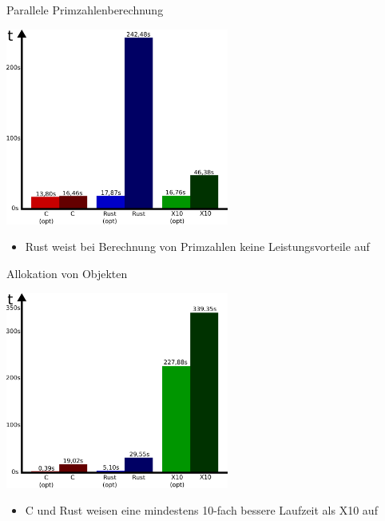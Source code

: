 \begin{frame}{Parallele Primzahlenberechnung}
  \begin{center}
    \includegraphics[width=0.55\textwidth]{images/primes-eval.pdf}
  \end{center}
  \begin{itemize}
    \item Rust weist bei Berechnung von Primzahlen keine Leistungsvorteile auf
  \end{itemize}
\end{frame}

\begin{frame}{Allokation von Objekten}
  \begin{center}
    \includegraphics[width=0.55\textwidth]{images/garbage-eval.pdf}
  \end{center}
  \begin{itemize}
    \item C und Rust weisen eine mindestens 10-fach bessere Laufzeit als X10 auf
  \end{itemize}
\end{frame}
